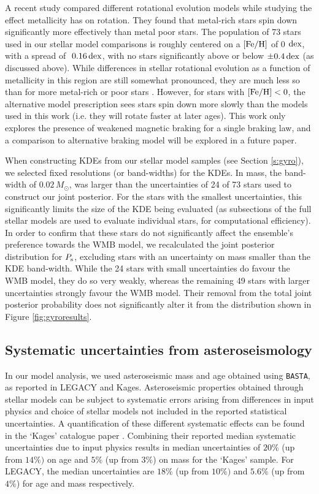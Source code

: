 A recent study \cite{m_amard+matt2020} compared different rotational evolution models \cite[of which we use the former in this work]{m_vansaders+pinsonneault2013,m_matt+2015} while studying the effect metallicity has on rotation. They found that metal-rich stars spin down significantly more effectively than metal poor stars. The population of 73 stars used in our stellar model comparisons is roughly centered on a $\rm{[Fe/H]}$ of 0 $\rm dex$, with a spread of $~0.16\, \rm dex$, with no stars significantly above or below $\pm 0.4\, \rm dex$ (as discussed above). While differences in stellar rotational evolution as a function of metallicity in this region are still somewhat pronounced, they are much less so than for more metal-rich or poor stars \cite[see Figure 2]{m_amard+matt2020}. However, for stars with $\mbox{$\rm{[Fe/H]}$} < 0$, the alternative model prescription \cite{m_matt+2015} sees stars spin down more slowly than the models used in this work (i.e. they will rotate faster at later ages). This work only explores the presence of weakened magnetic braking for a single braking law, and a comparison to alternative braking model will be explored in a future paper.

When constructing KDEs from our stellar model samples (see Section \ref{s:gyro}), we selected fixed resolutions (or band-widths) for the KDEs. In mass, the band-width of $0.02\, M_\odot$, was larger than the uncertainties of 24 of 73 stars used to construct our joint posterior. For the stars with the smallest uncertainties, this significantly limits the size of the KDE being evaluated (as subsections of the full stellar models are used to evaluate individual stars, for computational efficiency). In order to confirm that these stars do not significantly affect the ensemble's preference towards the WMB model, we recalculated the joint posterior distribution for $P_{\rm s}$, excluding stars with an uncertainty on mass smaller than the KDE band-width. While the 24 stars with small uncertainties do favour the WMB model, they do so very weakly, whereas the remaining 49 stars with larger uncertainties strongly favour the WMB model. Their removal from the total joint posterior probability does not significantly alter it from the distribution shown in Figure \ref{fig:gyroresults}.

\subsection{Systematic uncertainties from asteroseismology}
In our model analysis, we used asteroseismic mass and age obtained using \texttt{BASTA}, as reported in LEGACY and Kages. Asteroseismic properties obtained through stellar models can be subject to systematic errors arising from differences in input physics and choice of stellar models not included in the reported statistical uncertainties. A quantification of these different systematic effects can be found in the `Kages' catalogue paper \cite{m_silvaaguirre+2015}. Combining their reported median systematic uncertainties due to input physics results in median uncertainties of $20\%$ (up from $14\%)$ on age and $5\%$ (up from $3\%$) on mass for the `Kages' sample. For LEGACY, the median uncertainties are $18\%$ (up from $10\%)$ and $5.6\%$ (up from $4\%$) for age and mass respectively.

